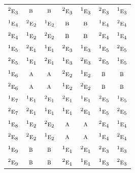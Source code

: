 \documentclass[10pt,a4paper]{article}
\numberwithin{equation}{section}
\newcommand{\irr}[1]{\text{\normalfont\scshape #1}}
\newcommand{\conjpair}[1]{{}^{#1}}
\begin{document}
{\begin{longtable}{@{}lcccccc@{}}
$\conjpair{2}\irr{e}_{3}$ & $\irr{b}$ & $\irr{b}$ & $\conjpair{2}\irr{e}_{3}$ & $\conjpair{1}\irr{e}_{3}$ & $\conjpair{2}\irr{e}_{3}$ & $\conjpair{1}\irr{e}_{3}$\\
$\conjpair{1}\irr{e}_{4}$ & $\conjpair{2}\irr{e}_{2}$ & $\conjpair{1}\irr{e}_{2}$ & $\irr{b}$ & $\irr{b}$ & $\conjpair{1}\irr{e}_{4}$ & $\conjpair{2}\irr{e}_{4}$\\
$\conjpair{2}\irr{e}_{4}$ & $\conjpair{1}\irr{e}_{2}$ & $\conjpair{2}\irr{e}_{2}$ & $\irr{b}$ & $\irr{b}$ & $\conjpair{2}\irr{e}_{4}$ & $\conjpair{1}\irr{e}_{4}$\\
$\conjpair{1}\irr{e}_{5}$ & $\conjpair{2}\irr{e}_{1}$ & $\conjpair{1}\irr{e}_{1}$ & $\conjpair{2}\irr{e}_{3}$ & $\conjpair{1}\irr{e}_{3}$ & $\conjpair{1}\irr{e}_{5}$ & $\conjpair{2}\irr{e}_{5}$\\
$\conjpair{2}\irr{e}_{5}$ & $\conjpair{1}\irr{e}_{1}$ & $\conjpair{2}\irr{e}_{1}$ & $\conjpair{1}\irr{e}_{3}$ & $\conjpair{2}\irr{e}_{3}$ & $\conjpair{2}\irr{e}_{5}$ & $\conjpair{1}\irr{e}_{5}$\\
$\conjpair{1}\irr{e}_{6}$ & $\irr{a}$ & $\irr{a}$ & $\conjpair{2}\irr{e}_{2}$ & $\conjpair{1}\irr{e}_{2}$ & $\irr{b}$ & $\irr{b}$\\
$\conjpair{2}\irr{e}_{6}$ & $\irr{a}$ & $\irr{a}$ & $\conjpair{1}\irr{e}_{2}$ & $\conjpair{2}\irr{e}_{2}$ & $\irr{b}$ & $\irr{b}$\\
$\conjpair{1}\irr{e}_{7}$ & $\conjpair{1}\irr{e}_{1}$ & $\conjpair{2}\irr{e}_{1}$ & $\conjpair{2}\irr{e}_{1}$ & $\conjpair{1}\irr{e}_{1}$ & $\conjpair{2}\irr{e}_{5}$ & $\conjpair{1}\irr{e}_{5}$\\
$\conjpair{2}\irr{e}_{7}$ & $\conjpair{2}\irr{e}_{1}$ & $\conjpair{1}\irr{e}_{1}$ & $\conjpair{1}\irr{e}_{1}$ & $\conjpair{2}\irr{e}_{1}$ & $\conjpair{1}\irr{e}_{5}$ & $\conjpair{2}\irr{e}_{5}$\\
$\conjpair{1}\irr{e}_{8}$ & $\conjpair{1}\irr{e}_{2}$ & $\conjpair{2}\irr{e}_{2}$ & $\irr{a}$ & $\irr{a}$ & $\conjpair{2}\irr{e}_{4}$ & $\conjpair{1}\irr{e}_{4}$\\
$\conjpair{2}\irr{e}_{8}$ & $\conjpair{2}\irr{e}_{2}$ & $\conjpair{1}\irr{e}_{2}$ & $\irr{a}$ & $\irr{a}$ & $\conjpair{1}\irr{e}_{4}$ & $\conjpair{2}\irr{e}_{4}$\\
$\conjpair{1}\irr{e}_{9}$ & $\irr{b}$ & $\irr{b}$ & $\conjpair{1}\irr{e}_{1}$ & $\conjpair{2}\irr{e}_{1}$ & $\conjpair{2}\irr{e}_{3}$ & $\conjpair{1}\irr{e}_{3}$\\
$\conjpair{2}\irr{e}_{9}$ & $\irr{b}$ & $\irr{b}$ & $\conjpair{2}\irr{e}_{1}$ & $\conjpair{1}\irr{e}_{1}$ & $\conjpair{1}\irr{e}_{3}$ & $\conjpair{2}\irr{e}_{3}$\\

\end{longtable}}
\end{document}
